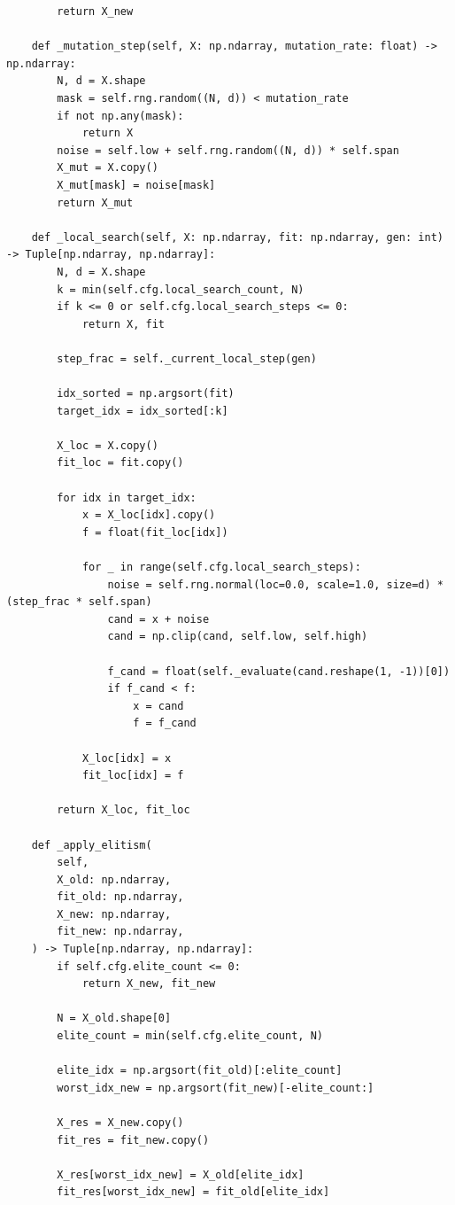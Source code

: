 \begin{lstlisting}
        return X_new

    def _mutation_step(self, X: np.ndarray, mutation_rate: float) -> np.ndarray:
        N, d = X.shape
        mask = self.rng.random((N, d)) < mutation_rate
        if not np.any(mask):
            return X
        noise = self.low + self.rng.random((N, d)) * self.span
        X_mut = X.copy()
        X_mut[mask] = noise[mask]
        return X_mut

    def _local_search(self, X: np.ndarray, fit: np.ndarray, gen: int) -> Tuple[np.ndarray, np.ndarray]:
        N, d = X.shape
        k = min(self.cfg.local_search_count, N)
        if k <= 0 or self.cfg.local_search_steps <= 0:
            return X, fit

        step_frac = self._current_local_step(gen)

        idx_sorted = np.argsort(fit)
        target_idx = idx_sorted[:k]

        X_loc = X.copy()
        fit_loc = fit.copy()

        for idx in target_idx:
            x = X_loc[idx].copy()
            f = float(fit_loc[idx])

            for _ in range(self.cfg.local_search_steps):
                noise = self.rng.normal(loc=0.0, scale=1.0, size=d) * (step_frac * self.span)
                cand = x + noise
                cand = np.clip(cand, self.low, self.high)

                f_cand = float(self._evaluate(cand.reshape(1, -1))[0])
                if f_cand < f:
                    x = cand
                    f = f_cand

            X_loc[idx] = x
            fit_loc[idx] = f

        return X_loc, fit_loc

    def _apply_elitism(
        self,
        X_old: np.ndarray,
        fit_old: np.ndarray,
        X_new: np.ndarray,
        fit_new: np.ndarray,
    ) -> Tuple[np.ndarray, np.ndarray]:
        if self.cfg.elite_count <= 0:
            return X_new, fit_new

        N = X_old.shape[0]
        elite_count = min(self.cfg.elite_count, N)

        elite_idx = np.argsort(fit_old)[:elite_count]
        worst_idx_new = np.argsort(fit_new)[-elite_count:]

        X_res = X_new.copy()
        fit_res = fit_new.copy()

        X_res[worst_idx_new] = X_old[elite_idx]
        fit_res[worst_idx_new] = fit_old[elite_idx]


\end{lstlisting}
